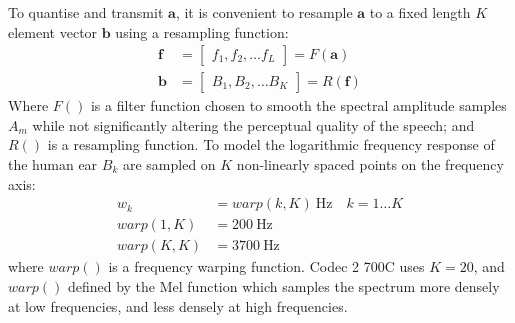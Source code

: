 \documentclass{article}
\begin{document}
To quantise and transmit $\mathbf{a}$, it is convenient to resample $\mathbf{a}$ to a fixed length $K$ element vector $\mathbf{b}$ using a resampling function:
\begin{equation}
\begin{split}
\mathbf{f} &= \begin{bmatrix} f_1, f_2, \ldots f_L \end{bmatrix} = F(\mathbf{a}) \\
\mathbf{b} &= \begin{bmatrix} B_1, B_2, \ldots B_K \end{bmatrix} = R(\mathbf{f})
\end{split}
\end{equation}
Where $F()$ is a filter function chosen to smooth the spectral amplitude samples $A_m$ while not significantly altering the perceptual quality of the speech; and $R()$ is a resampling function. To model the logarithmic frequency response of the human ear $B_k$  are sampled on $K$ non-linearly spaced points on the frequency axis:
\begin{equation}
\begin{split}
w_k &= warp(k,K) \ \textrm{Hz} \quad k=1 \ldots K \\
warp(1,K) &= 200 \ \textrm{Hz} \\
warp(K,K) &= 3700 \ \textrm{Hz}
\end{split}
\end{equation}
where $warp()$ is a frequency warping function. Codec 2 700C uses $K=20$, and $warp()$ defined by the Mel function which samples the spectrum more densely at low frequencies, and less densely at high frequencies.
\end{document}
